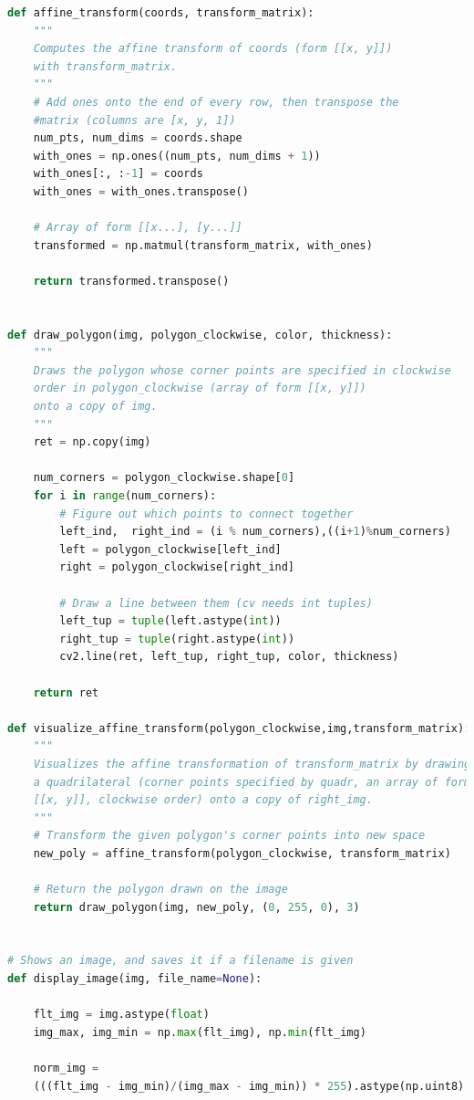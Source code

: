 \documentclass{exam}
\begin{document}
\begin{questions}
\begin{parts}
\begin{lstlisting}[language=python, frame=single]
def affine_transform(coords, transform_matrix):
    """
    Computes the affine transform of coords (form [[x, y]]) 
    with transform_matrix.
    """
    # Add ones onto the end of every row, then transpose the 
    #matrix (columns are [x, y, 1])
    num_pts, num_dims = coords.shape
    with_ones = np.ones((num_pts, num_dims + 1))
    with_ones[:, :-1] = coords
    with_ones = with_ones.transpose()
    
    # Array of form [[x...], [y...]]
    transformed = np.matmul(transform_matrix, with_ones)
    
    return transformed.transpose()
    

def draw_polygon(img, polygon_clockwise, color, thickness):
    """
    Draws the polygon whose corner points are specified in clockwise 
    order in polygon_clockwise (array of form [[x, y]]) 
    onto a copy of img.
    """
    ret = np.copy(img)
    
    num_corners = polygon_clockwise.shape[0]
    for i in range(num_corners):
        # Figure out which points to connect together
        left_ind,  right_ind = (i % num_corners),((i+1)%num_corners)
        left = polygon_clockwise[left_ind]
        right = polygon_clockwise[right_ind]
        
        # Draw a line between them (cv needs int tuples)
        left_tup = tuple(left.astype(int))
        right_tup = tuple(right.astype(int))
        cv2.line(ret, left_tup, right_tup, color, thickness)
        
    return ret

def visualize_affine_transform(polygon_clockwise,img,transform_matrix):
    """
    Visualizes the affine transformation of transform_matrix by drawing 
    a quadrilateral (corner points specified by quadr, an array of form
    [[x, y]], clockwise order) onto a copy of right_img.
    """
    # Transform the given polygon's corner points into new space
    new_poly = affine_transform(polygon_clockwise, transform_matrix)
    
    # Return the polygon drawn on the image
    return draw_polygon(img, new_poly, (0, 255, 0), 3)
    

# Shows an image, and saves it if a filename is given
def display_image(img, file_name=None):
    
    flt_img = img.astype(float)
    img_max, img_min = np.max(flt_img), np.min(flt_img)
    
    norm_img = 
    (((flt_img - img_min)/(img_max - img_min)) * 255).astype(np.uint8)
    

\end{lstlisting}
\end{parts}
\end{questions}
\end{document}
